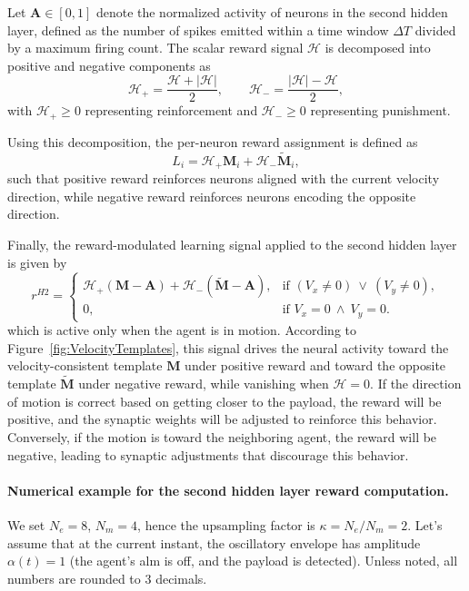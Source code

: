 Let \(\mathbf{A} \in [0,1]\) denote the normalized activity of neurons in the second hidden layer, defined as the
number of spikes emitted within a time window \(\Delta T\) divided by a maximum firing count.
The scalar reward signal \(\mathcal{H}\) is decomposed into positive and negative components as
\begin{equation}
\mathcal{H}_+ = \frac{\mathcal{H} + |\mathcal{H}|}{2}, \qquad
\mathcal{H}_- = \frac{|\mathcal{H}| - \mathcal{H}}{2},
\end{equation}
with \(\mathcal{H}_+ \ge 0\) representing reinforcement and \(\mathcal{H}_- \ge 0\) representing punishment.

Using this decomposition, the per-neuron reward assignment is defined as
\begin{equation}
L_i = \mathcal{H}_+ \mathbf{M}_i + \mathcal{H}_- \widetilde{\mathbf{M}}_i,
\end{equation}
such that positive reward reinforces neurons aligned with the current velocity direction,
while negative reward reinforces neurons encoding the opposite direction.

Finally, the reward-modulated learning signal applied to the second hidden layer is given by
\begin{equation}
r^{H2} =
\begin{cases}
\mathcal{H}_+(\mathbf{M}-\mathbf{A}) + \mathcal{H}_-(\widetilde{\mathbf{M}}-\mathbf{A}),
& \text{if } (V_x \neq 0)\ \lor\ (V_y \neq 0),\\[0.5ex]
0, & \text{if } V_x = 0 \ \land\ V_y = 0.
\end{cases}
\end{equation}
which is active only when the agent is in motion.
According to Figure~\ref{fig:VelocityTemplates}, this signal drives the neural activity toward the velocity-consistent template \(\mathbf{M}\) under positive
reward and toward the opposite template \(\widetilde{\mathbf{M}}\) under negative reward, while vanishing when
\(\mathcal{H}=0\). If the direction of motion is correct based on getting closer to the payload, the reward will be positive, and the synaptic weights will be adjusted to reinforce this behavior. Conversely, if the motion is toward the neighboring agent, the reward will be negative, leading to synaptic adjustments that discourage this behavior.

\paragraph{Numerical example for the second hidden layer reward computation.}
We set $N_e=8$, $N_m=4$, hence the upsampling factor is $\kappa=N_e/N_m=2$.  
Let's assume that at the current instant, the oscillatory envelope has amplitude $\alpha(t)=1$ (the agent's \ac{alm} is off, and the payload is detected).  
Unless noted, all numbers are rounded to $3$ decimals.

